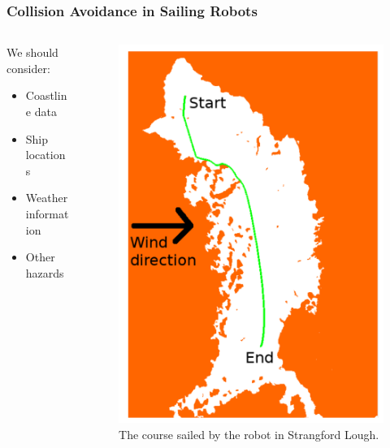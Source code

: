 \documentclass[
    11pt, %
    aspectratio=169, %
]{beamer}
\begin{document}
\begin{frame}
    \frametitle{Collision Avoidance in Sailing Robots}

    \begin{columns}[c]
        \begin{column}{0.5\textwidth}
            We should consider:
            \begin{itemize}
                \item Coastline data
                \item Ship locations
                \item Weather information
                \item Other hazards
            \end{itemize}
        \end{column}
        \begin{column}{0.5\textwidth}
            \begin{center}
                \begin{figure}
                    \includegraphics[scale=0.25]{assets/casr-result.png}
                    \caption{The course sailed by the robot in Strangford Lough.}
                \end{figure}
            \end{center}
        \end{column}
    \end{columns}
\end{frame}
\end{document}

